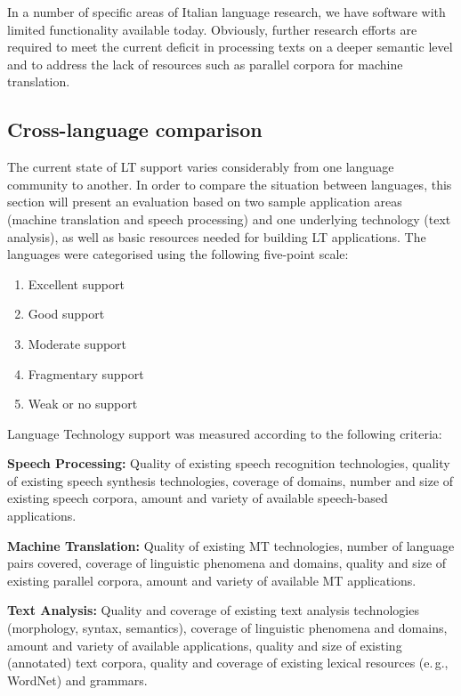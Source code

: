 \begin{multicols}{2}
In a number of specific areas of Italian language research, we have software with limited functionality available today. Obviously, further research efforts are required to meet the current deficit in processing texts on a deeper semantic level and to address the lack of resources such as parallel corpora for machine translation.




\subsection{Cross-language comparison}

The current state of LT support varies considerably from one language community to another. In order to compare the situation between languages, this section will present an evaluation based on two sample application areas (machine translation and speech processing) and one underlying technology (text analysis), as well as basic resources needed for building LT applications. The languages were categorised using the following five-point scale: 

\begin{enumerate}
\item Excellent support
\item Good support
\item Moderate support
\item Fragmentary support
\item Weak or no support
\end{enumerate}


Language Technology support was measured according to the following criteria:

\textbf{Speech Processing:} Quality of existing speech recognition technologies, quality of existing speech synthesis technologies, coverage of domains, number and size of existing speech corpora, amount and variety of available speech-based applications.

\textbf{Machine Translation:} Quality of existing MT technologies, number of language pairs covered, coverage of linguistic phenomena and domains, quality and size of existing parallel corpora, amount and variety of available MT applications.

\textbf{Text Analysis:} Quality and coverage of existing text analysis technologies (morphology, syntax, semantics), coverage of linguistic phenomena and domains, amount and variety of available applications, quality and size of existing (annotated) text corpora, quality and coverage of existing lexical resources (e.\,g., WordNet) and grammars.


\end{multicols}
